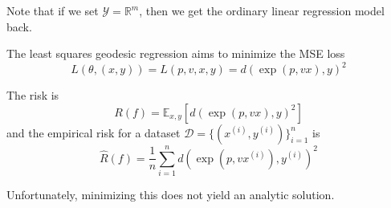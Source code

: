   Note that if we set $\mathcal{Y} = \mathbb{R}^m$, then we get the ordinary linear regression model back. 

  \begin{definition}
    The least squares geodesic regression aims to minimize the MSE loss 
    \begin{equation}
      L(\theta, (x, y)) = L(p, v, x, y) = d(\exp(p, vx), y)^2
    \end{equation}
  \end{definition}

  \begin{lemma}[Risk]
    The risk is 
    \begin{equation}
      R(f) = \mathbb{E}_{x, y} \left[ d(\exp(p, vx), y)^2 \right]
    \end{equation} 
    and the empirical risk for a dataset $\mathcal{D} = \{(x^{(i)}, y^{(i)})\}_{i=1}^n$ is 
    \begin{equation}
      \hat{R}(f) = \frac{1}{n} \sum_{i=1}^n d(\exp(p, v x^{(i)}), y^{(i)})^2
    \end{equation}
  \end{lemma}

  Unfortunately, minimizing this does not yield an analytic solution. 
